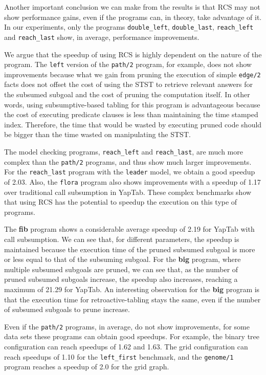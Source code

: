 Another important conclusion we can make from the results is that RCS may not show performance gains, even if the
programs can, in theory, take advantage of it. In our experiments, only the programs \texttt{double\_left},
\texttt{double\_last}, \texttt{reach\_left} and \texttt{reach\_last} show, in average, performance improvements.

We argue that the speedup of using RCS is highly dependent on the nature of the program.
The \texttt{left} version
of the \texttt{path/2} program, for example, does not show improvements because what we gain from pruning the
execution of simple \texttt{edge/2} facts does not offset the cost of using the STST to retrieve relevant answers
for the subsumed subgoal and
the cost of pruning the computation itself. In other words, using subsumptive-based tabling for this program is
advantageous because the cost of executing predicate clauses is less than maintaining the time stamped index.
Therefore, the time that would be wasted by executing pruned code should be bigger than the time wasted
on manipulating the STST.

The model checking programs, \texttt{reach\_left} and \texttt{reach\_last}, are much more complex than the \texttt{path/2}
programs, and thus show much larger improvements. For the \texttt{reach\_last} program with the \texttt{leader} model,
we obtain a good speedup of 2.03. Also, the \texttt{flora} program also shows improvements with a speedup of 1.17 over
traditional call subsumption in YapTab. These complex benchmarks show that using RCS has the potential to speedup the
execution on this type of programs.

The \textbf{fib} program shows a considerable average speedup of 2.19 for YapTab with call subsumption.
We can see that, for different parameters, the speedup is maintained because the execution time of the pruned subsumed
subgoal is more or less equal to that of the subsuming subgoal. For the \textbf{big} program, where multiple
subsumed subgoals are pruned, we can see that, as the number of pruned subsumed subgoals increase, the speedup
also increases, reaching a maximum of 21.29 for YapTab. An interesting observation for the \textbf{big} program is
that the execution time for retroactive-tabling stays the same, even if the number of subsumed subgoals to prune
increase.

Even if the \texttt{path/2} programs, in average, do not show improvements, for some data sets
these programs can obtain good speedups. For example, the binary tree configuration can reach speedups of 1.62 and 1.63. The grid configuration can reach speedups of 1.10 for the \texttt{left\_first} benchmark, and the \texttt{genome/1}
program reaches a speedup of 2.0 for the grid graph.

